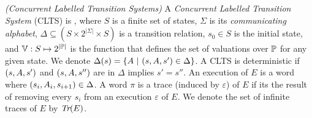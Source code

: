 \begin{definition}
	\label{def:CLTS} \emph{(Concurrent Labelled Transition Systems)} 
	A \emph{Concurrent Labelled Transition System} (CLTS) is \cltsDef, where $S$ is a finite set of states, $\Sigma$ is its {\em communicating alphabet}, $\Delta \subseteq (S \times 2^{|\Sigma|} \times S)$ is a transition relation, $s_0 \in S$ is the initial state, and ${\mathbb{V}} : S \mapsto  2^{|{\mathbb{P}}|}$ is the function that defines the set of valuations over ${\mathbb{P}}$ for any given state.  We denote $\Delta(s)=\{A~|~(s,A,s') \in \Delta\}$. 
	A CLTS is deterministic if $(s,A,s')$ and $(s,A,s'')$ are in $\Delta$ implies $s'=s''$.
	An execution of $E$ is a word \executionDef where $(s_i, A_i, s_{i+1}) \in \Delta$. 
	A word $\pi$ is a trace (induced by $\varepsilon$) of $E$ if its the result of removing every $s_i$ from an execution $\varepsilon$ of $E$. 
	We denote the set of infinite traces of $E$ by $\emph{Tr}(E)$. 
\end{definition}